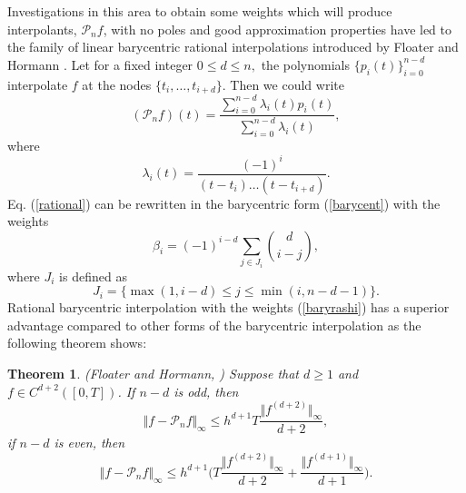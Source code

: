 \documentclass[fleqn,final,3p,11pt]{elsarticle}
\newtheorem{theorem}{Theorem}[section]
\theoremstyle{definition}
\theoremstyle{remark}
\numberwithin{equation}{section}
\begin{document}
Investigations in this area to obtain some weights which will produce interpolants, $ \mathcal{P}_{n}f $, with no poles and good approximation
properties have led to the family of linear barycentric
rational interpolations introduced by Floater and Hormann \cite{kai}.
Let for a fixed integer $ 0\leq d \leq n, $ the polynomials $ \{p_{i}(t) \}_{i=0}^{n-d} $ interpolate $ f $ at the nodes
$ \{ t_{i}, \ldots, t_{i+d}\} $. Then we could write
\begin{equation}\label{rational}
(\mathcal{P}_{n}f)(t)=\frac{\sum_{i=0}^{n-d} \lambda_{i}(t)p_{i}(t)}{\sum_{i=0}^{n-d} \lambda_{i}(t)},
\end{equation}
where
\begin{equation*}
\lambda_{i}(t)= \frac{(-1)^{i}}{(t-t_{i})\ldots (t-t_{i+d}) }.
\end{equation*}
Eq. (\ref{rational}) can be rewritten in the barycentric form (\ref{barycent}) with the weights
\begin{equation}\label{baryrashi}
\beta_{i}=(-1)^{i-d}\sum_{j\in J_{i}} \binom {d} {i-j},
\end{equation}
where $ J_{i} $ is defined as
\[ J_{i}=\{ \max (1, i-d) \leq j \leq \min (i, n-d-1) \}.\]
Rational barycentric interpolation with the weights (\ref{baryrashi}) has a superior advantage compared to other forms of the barycentric interpolation as the following theorem shows:
\begin{theorem}\label{inregh} (Floater and Hormann, \cite{kai}) Suppose that $d\geq 1$ and $f \in C^{d+2}([0, T])$. If $n-d$ is odd, then
\[
\Vert f - \mathcal{P}_{n}f \Vert_{\infty} \leq h^{d+1} T\frac{\Vert f^{(d+2)}\Vert_{\infty}}{d+2},
\]
if $n-d$ is even, then
\[
\Vert f - \mathcal{P}_{n}f \Vert_{\infty} \leq h^{d+1}\Big( T\frac{\Vert f^{(d+2)}\Vert_{\infty}}{d+2} + \frac{\Vert f^{(d+1)}\Vert_{\infty}}{d+1}\Big).
\]
\end{theorem}
\end{document}
